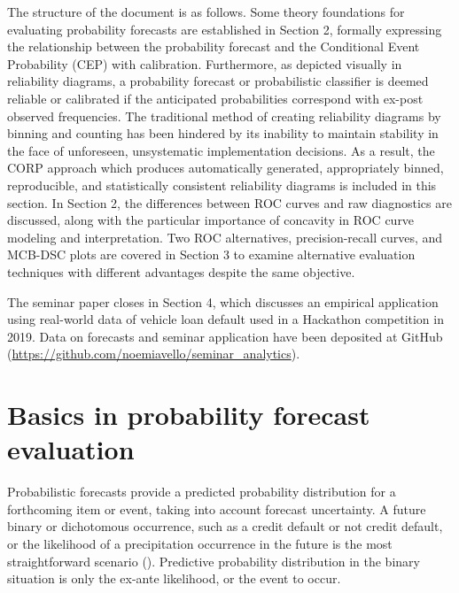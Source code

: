 \documentclass[a4paper,12pt]{article}
\numberwithin{equation}{section}
\begin{document}
The structure of the document is as follows. Some theory foundations for evaluating probability forecasts are established in Section 2, formally expressing the relationship between the probability forecast and the Conditional Event Probability (CEP) with calibration. Furthermore, as depicted visually in reliability diagrams, a probability forecast or probabilistic classifier is deemed reliable or calibrated if the anticipated probabilities correspond with ex-post observed frequencies. The traditional method of creating reliability diagrams by binning and counting has been hindered by its inability to maintain stability in the face of unforeseen, unsystematic implementation decisions. As a result, the CORP approach which produces automatically generated, appropriately binned, reproducible, and statistically consistent reliability diagrams is included in this section. In Section 2, the differences between ROC curves and raw diagnostics are discussed, along with the particular importance of concavity in ROC curve modeling and interpretation. Two ROC alternatives, precision-recall curves, and MCB-DSC plots are covered in Section 3 to examine alternative evaluation techniques with different advantages despite the same objective.\bigskip

The seminar paper closes in Section 4, which discusses an empirical application using real-world data of vehicle loan default used in a Hackathon competition in 2019. Data on forecasts and seminar application have been deposited at GitHub (\url{https://github.com/noemiavello/seminar_analytics}).


\section{Basics in probability forecast evaluation}
\label{Chapter:Probability forecast}  

Probabilistic forecasts provide a predicted probability distribution for a forthcoming item or event, taking into account forecast uncertainty. A future binary or dichotomous occurrence, such as a credit default or not credit default, or the likelihood of a precipitation occurrence in the future is the most straightforward scenario (\cite{Forecast2}). Predictive probability distribution in the binary situation is only the ex-ante likelihood, or the event to occur. \bigskip
\end{document}

